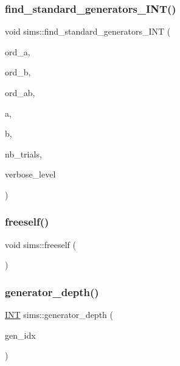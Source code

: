 \subsubsection{\texorpdfstring{find\+\_\+standard\+\_\+generators\+\_\+\+I\+N\+T()}{find\_standard\_generators\_INT()}}
{\footnotesize\ttfamily void sims\+::find\+\_\+standard\+\_\+generators\+\_\+\+I\+NT (\begin{DoxyParamCaption}\item[{\mbox{\hyperlink{galois_8h_a09fddde158a3a20bd2dcadb609de11dc}{I\+NT}}}]{ord\+\_\+a,  }\item[{\mbox{\hyperlink{galois_8h_a09fddde158a3a20bd2dcadb609de11dc}{I\+NT}}}]{ord\+\_\+b,  }\item[{\mbox{\hyperlink{galois_8h_a09fddde158a3a20bd2dcadb609de11dc}{I\+NT}}}]{ord\+\_\+ab,  }\item[{\mbox{\hyperlink{galois_8h_a09fddde158a3a20bd2dcadb609de11dc}{I\+NT}} \&}]{a,  }\item[{\mbox{\hyperlink{galois_8h_a09fddde158a3a20bd2dcadb609de11dc}{I\+NT}} \&}]{b,  }\item[{\mbox{\hyperlink{galois_8h_a09fddde158a3a20bd2dcadb609de11dc}{I\+NT}} \&}]{nb\+\_\+trials,  }\item[{\mbox{\hyperlink{galois_8h_a09fddde158a3a20bd2dcadb609de11dc}{I\+NT}}}]{verbose\+\_\+level }\end{DoxyParamCaption})}

\mbox{\label{classsims_ab596438fd94e1fcafbf69d32024e93bf}} 
\subsubsection{\texorpdfstring{freeself()}{freeself()}}
{\footnotesize\ttfamily void sims\+::freeself (\begin{DoxyParamCaption}{ }\end{DoxyParamCaption})}

\mbox{\label{classsims_acdcef5adbae43ca98568ba1e6aa5b6a2}} 
\subsubsection{\texorpdfstring{generator\+\_\+depth()}{generator\_depth()}\hspace{0.1cm}{\footnotesize\ttfamily [1/2]}}
{\footnotesize\ttfamily \mbox{\hyperlink{galois_8h_a09fddde158a3a20bd2dcadb609de11dc}{I\+NT}} sims\+::generator\+\_\+depth (\begin{DoxyParamCaption}\item[{\mbox{\hyperlink{galois_8h_a09fddde158a3a20bd2dcadb609de11dc}{I\+NT}}}]{gen\+\_\+idx }\end{DoxyParamCaption})}


